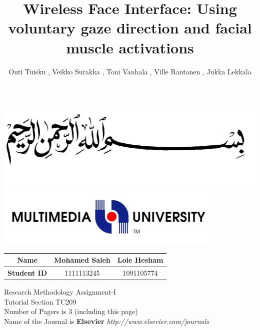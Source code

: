 \documentclass[a4paper]{article}
\begin{document}
\begin{center}
\includegraphics[scale=0.2]{besm.jpg}\\

\includegraphics[scale=1.5]{mmulogo.png}\\ 
\end{center} 
\nopagebreak[3]

\begin{flushleft}
\begin{tabular}{|c| c| c|}
\hline
\large \bf Name & \large Mohamed Saleh & \large Loie Hesham \\
\hline
\large \bf Student ID & \large 1111113245 & \large 1091105774 \\
\hline
\end{tabular}  \newline \newline \newline 

{\Large Research Methodology Assignment-I \\
Tutorial Section TC209 \\
Number of Pagers is 3 (including this page) \\
Name of the Journal is {\bf Elsevier} {\it http://www.elsevier.com/journals} } \newline \newline \newline 
\end{flushleft} 

\tableofcontents


\title{Wireless Face Interface: Using voluntary gaze direction and facial muscle activations}
\author{ Outi Tuisku , Veikko Surakka , Toni Vanhala , Ville Rantanen , Jukka Lekkala}


\maketitle
{} \\
\end{document}
